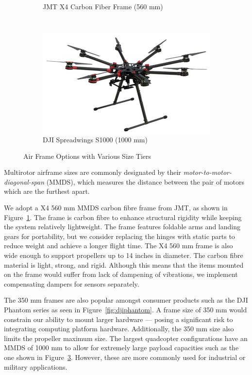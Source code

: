 \begin{figure}[h]
\begin{subfigure}[b]{0.33\textwidth}
		\caption{JMT X4 Carbon Fiber Frame (560 mm)}
		\label{fig:jmtx4}
	\end{subfigure}
	~
	\begin{subfigure}[b]{0.33\textwidth}
		\centering
		\includegraphics[width=\textwidth]{img/djis1000}
		\caption{DJI Spreadwings S1000 (1000 mm)}
		\label{fig:djis1000}
	\end{subfigure}
	
	\caption{Air Frame Options with Various Size Tiers }
\end{figure}

Multirotor airframe sizes are commonly designated by their \textit{motor-to-motor-diagonal-span} (MMDS), which measures the distance between the pair of motors which are the furthest apart. 

We adopt a X4 560 mm MMDS carbon fibre frame from JMT, as shown in Figure~\ref{fig:jmtx4}. The frame is carbon fibre to enhance structural rigidity while keeping the system relatively lightweight. The frame features foldable arms and landing gears for portability, but we consider replacing the hinges with static parts to reduce  weight and achieve a longer flight time. The X4 560 mm frame is also wide enough to support propellers up to 14 inches in diameter. The carbon fibre material is light, strong, and rigid. Although this means that the items mounted on the frame would suffer from lack of dampening of vibrations, we implement compensating dampers for sensors separately.

The 350 mm frames are also popular amongst consumer products such as the DJI Phantom series\cite{dji-phantom-3-specs} as seen in Figure~\ref{fig:djiphantom}. A frame size of 350 mm would constrain our ability to mount larger hardware --- posing a significant risk to integrating computing platform hardware. Additionally, the 350 mm size also limits the propeller maximum size. The largest quadcopter configurations have an MMDS of 1000 mm to allow for extremely large payload capacities such as the one shown in Figure~\ref{fig:djis1000}. However, these are more commonly used for industrial or military applications.


